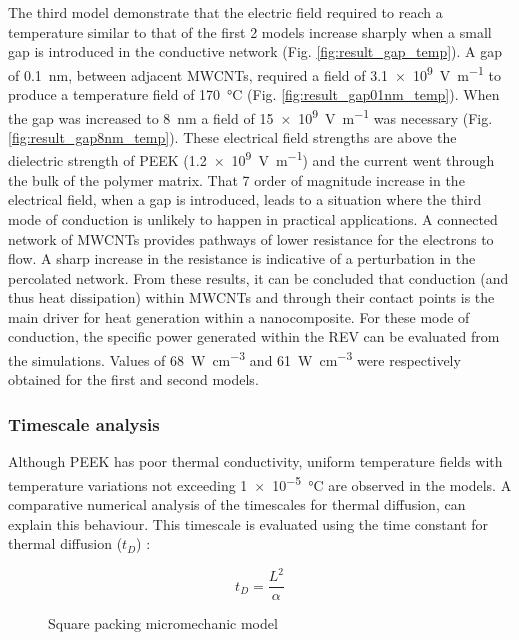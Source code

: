 \documentclass[11pt,review,times]{elsarticle}
\begin{document}
The third model demonstrate that the electric field required to reach a temperature similar to that of the first 2 models increase sharply when a small gap is introduced in the conductive network (Fig. \ref{fig:result_gap_temp}). 
A gap of \SI{0.1}{\nano\metre}, between adjacent MWCNTs, required a field of \SI{3.1e9}{\volt\per\metre} to produce a temperature field of \SI{170}{\celsius} (Fig. \ref{fig:result_gap01nm_temp}). 
When the gap was increased to \SI{8}{\nano\metre} a field of \SI{15e9}{\volt\per\metre} was necessary (Fig. \ref{fig:result_gap8nm_temp}). 
These electrical field strengths are above the dielectric strength of PEEK (\SI{1.2e9}{\volt\per\metre}) and the current went through the bulk of the polymer matrix. 
That 7 order of magnitude increase in the electrical field, when a gap is introduced, leads to a situation where the third mode of conduction is unlikely to happen in practical applications. 
A connected network of MWCNTs provides pathways of lower resistance for the electrons to flow. 
A sharp increase in the resistance is indicative of a perturbation in the percolated network. 
From these results, it can be concluded that conduction (and thus heat dissipation) within MWCNTs and through their contact points is the main driver for heat generation within a nanocomposite. 
For these mode of conduction, the specific power generated within the REV can be evaluated from the simulations. 
Values of \SI{68}{\watt\per\cubic\centi\metre} and \SI{61}{\watt\per\cubic\centi\metre} were respectively obtained for the first and second models. 

\subsubsection{Timescale analysis}

Although PEEK has poor thermal conductivity, uniform temperature fields with temperature variations not exceeding \SI{1e-5}{\celsius} are observed in the models. 
A comparative numerical analysis of the timescales for thermal diffusion, can explain this behaviour. 
This timescale is evaluated using the time constant for thermal diffusion ($t_D$) : 

\begin{equation}
	t_D = \frac{L^2}{\alpha}
	\label{equa:time_constant}
\end{equation}

\begin{figure}[htb]
	\center
	\captionsetup{width=35mm}
	\resizebox{35mm}{!}{%
	
	}
	\caption{Square packing micromechanic model}
	\label{fig:square_packing}
\end{figure}
\end{document}
